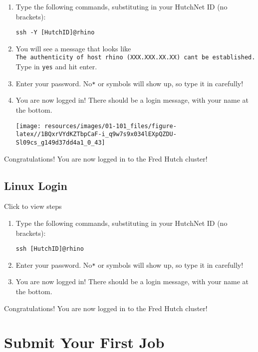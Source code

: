\documentclass[
]{book}
\begin{document}
\begin{enumerate}
\def\labelenumi{\arabic{enumi}.}
\item
  Type the following commands, substituting in your HutchNet ID (no brackets):

\begin{verbatim}
ssh -Y [HutchID]@rhino
\end{verbatim}
\item
  You will see a message that looks like \texttt{The\ authenticity\ of\ host\ \textquotesingle{}rhino\ (XXX.XXX.XX.XX)\textquotesingle{}\ can\textquotesingle{}t\ be\ established.} Type in \texttt{yes} and hit enter.
\item
  Enter your password. No\texttt{*} or symbols will show up, so type it in carefully!
\item
  You are now logged in! There should be a login message, with your name at the bottom.

  \texttt{[image: resources/images/01-101\_files/figure-latex//1BQxrVYdKZTbpCaF-i\_q9w7s9x034lEXpQZDU-Sl09cs\_g149d37dd4a1\_0\_43]}
\end{enumerate}

Congratulations! You are now logged in to the Fred Hutch cluster!

\hypertarget{linux-login}{%
\section{Linux Login}\label{linux-login}}

Click to view steps

\begin{enumerate}
\def\labelenumi{\arabic{enumi}.}
\item
  Type the following commands, substituting in your HutchNet ID (no brackets):

\begin{verbatim}
ssh [HutchID]@rhino
\end{verbatim}
\item
  Enter your password. No\texttt{*} or symbols will show up, so type it in carefully!\\
\item
  You are now logged in! There should be a login message, with your name at the bottom.
\end{enumerate}

Congratulations! You are now logged in to the Fred Hutch cluster!

\hypertarget{submit-your-first-job}{%
\chapter{Submit Your First Job}\label{submit-your-first-job}}
\end{document}
